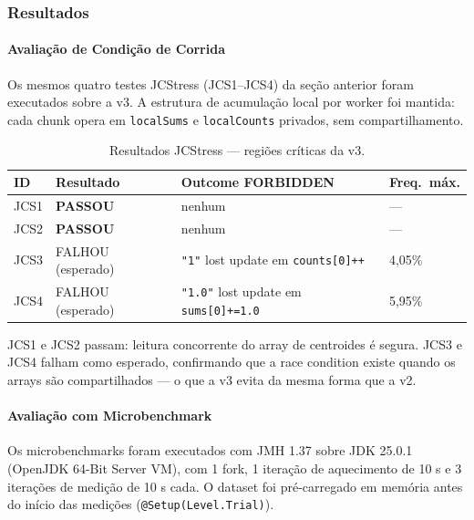 \subsubsection{Resultados}

\paragraph{Avaliação de Condição de Corrida}

Os mesmos quatro testes JCStress (JCS1--JCS4) da seção anterior foram executados
sobre a v3. A estrutura de acumulação local por worker foi mantida: cada chunk opera
em \texttt{localSums} e \texttt{localCounts} privados, sem compartilhamento.

\begin{table}[H]
\centering
\begin{tabular}{llll}
\hline
\textbf{ID} & \textbf{Resultado} & \textbf{Outcome FORBIDDEN} & \textbf{Freq.\ máx.} \\
\hline
JCS1 & \textbf{PASSOU}   & nenhum                                        & ---     \\
JCS2 & \textbf{PASSOU}   & nenhum                                        & ---     \\
JCS3 & FALHOU (esperado) & \texttt{"1"} lost update em \texttt{counts[0]++}   & 4{,}05\% \\
JCS4 & FALHOU (esperado) & \texttt{"1.0"} lost update em \texttt{sums[0]+=1.0} & 5{,}95\% \\
\hline
\end{tabular}
\caption{Resultados JCStress --- regiões críticas da v3.}
\label{tab:jcstress-v3}
\end{table}

JCS1 e JCS2 passam: leitura concorrente do array de centroides é segura. JCS3 e
JCS4 falham como esperado, confirmando que a race condition existe quando os arrays
são compartilhados --- o que a v3 evita da mesma forma que a v2.

\paragraph{Avaliação com Microbenchmark}

Os microbenchmarks foram executados com JMH 1.37 sobre JDK 25.0.1
(OpenJDK 64-Bit Server VM), com 1 fork, 1 iteração de aquecimento de 10 s e 3
iterações de medição de 10 s cada. O dataset foi pré-carregado em memória antes do
início das medições (\texttt{@Setup(Level.Trial)}).

